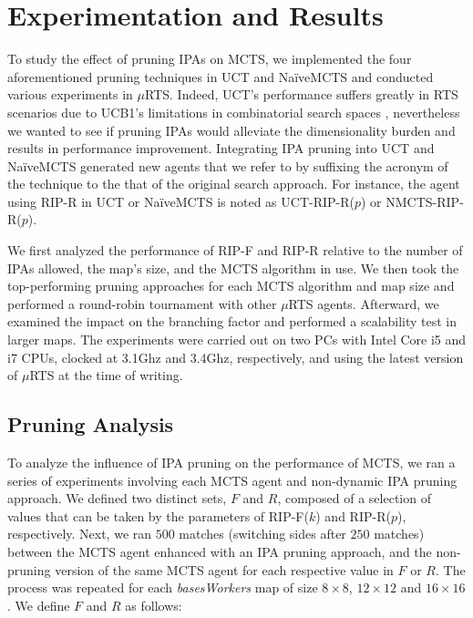 \documentclass[conference]{IEEEtran}
\newcommand{\mRTS}{$\mu$RTS}
\begin{document}


\section{Experimentation and Results}
\label{sec:experiments}


To study the effect of pruning IPAs on MCTS, we implemented the four aforementioned pruning techniques in UCT and NaïveMCTS and conducted various experiments in \mRTS{}. Indeed, UCT's performance suffers greatly in RTS scenarios due to UCB1's limitations in combinatorial search spaces \cite{ontanon_combinatorial_2013}, nevertheless we wanted to see if pruning IPAs would alleviate the dimensionality burden and results in performance improvement. Integrating IPA pruning into UCT and NaïveMCTS generated new agents that we refer to by suffixing the acronym of the technique to the that of the original search approach. For instance, the agent using RIP-R in UCT or NaïveMCTS is noted as UCT-RIP-R($p$) or NMCTS-RIP-R($p$).

We first analyzed the performance of RIP-F and RIP-R relative to the number of IPAs allowed, the map's size, and the MCTS algorithm in use. We then took the top-performing pruning approaches for each MCTS algorithm and map size and performed a round-robin tournament with other \mRTS{} agents. Afterward, we examined the impact on the branching factor and performed a scalability test in larger maps. The experiments were carried out on two PCs with Intel Core i5 and i7 CPUs, clocked at 3.1Ghz and 3.4Ghz, respectively, and using the latest version of \mRTS{} at the time of writing.


\subsection{Pruning Analysis}

To analyze the influence of IPA pruning on the performance of MCTS, we ran a series of experiments involving each MCTS agent and non-dynamic IPA pruning approach. We defined two distinct sets, $F$ and $R$, composed of a selection of values that can be taken by the parameters of RIP-F($k$) and RIP-R($p$), respectively. Next, we ran $500$ matches (switching sides after $250$ matches) between the MCTS agent enhanced with an IPA pruning approach, and the non-pruning version of the same MCTS agent for each respective value in $F$ or $R$. The process was repeated for each \textit{basesWorkers} map of size $8\times8$, $12\times12$ and $16\times16$. We define $F$ and $R$ as follows:
\end{document}
